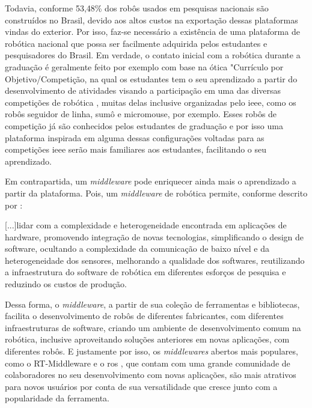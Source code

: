 Todavia, conforme  53,48\% dos robôs usados em pesquisas nacionais são construídos no Brasil, devido aos altos custos na exportação dessas plataformas vindas do exterior. Por isso, faz-se necessário a existência de uma plataforma de robótica nacional que possa ser facilmente adquirida pelos estudantes e pesquisadores do Brasil. Em verdade, o contato inicial com a robótica durante a graduação é geralmente feito por exemplo com base na ótica "Currículo por Objetivo/Competição, na qual os estudantes tem o seu aprendizado a partir do desenvolvimento de atividades visando a participação em uma das diversas competições de robótica \cite{Campos2017}, muitas delas inclusive organizadas pelo \gls*{ieee}, como os robôs seguidor de linha, sumô e micromouse, por exemplo. Esses robôs de competição já são conhecidos pelos estudantes de graduação e por isso uma plataforma inspirada em alguma dessas configurações voltadas para as competições \acrshort*{ieee} serão mais familiares aos estudantes, facilitando o seu aprendizado. 

Em contrapartida, um \textit{middleware} pode enriquecer ainda mais o aprendizado a partir da plataforma. Pois, um \textit{middleware} de robótica permite, conforme descrito por :

\begin{quoting}[rightmargin=0cm,leftmargin=4cm]
	\begin{singlespace}
		{\footnotesize
			[...]lidar com a complexidade e heterogeneidade encontrada em aplicações de hardware, promovendo integração de novas tecnologias, simplificando o design de software, ocultando a complexidade da comunicação de baixo nível e da heterogeneidade dos sensores, melhorando a qualidade dos softwares, reutilizando a infraestrutura do software de robótica em diferentes esforços de pesquisa e reduzindo os custos de produção.
		}
	\end{singlespace}
\end{quoting}

Dessa forma, o \textit{middleware}, a partir de sua coleção de ferramentas e bibliotecas, facilita o desenvolvimento de robôs de diferentes fabricantes, com diferentes infraestruturas de software, criando um ambiente de desenvolvimento comum na robótica, inclusive aproveitando soluções anteriores em novas aplicações, com diferentes robôs. E justamente por isso, os \textit{middlewares} abertos mais populares, como o RT-Middleware e o \gls*{ros} \cite{Elkady2012}, que contam com uma grande comunidade de colaboradores no seu desenvolvimento com novas aplicações, são mais atrativos para novos usuários por conta de sua versatilidade que cresce junto com a popularidade da ferramenta.

